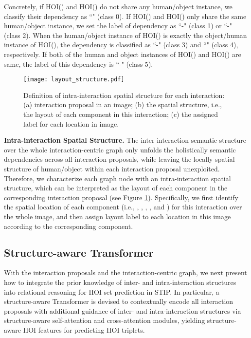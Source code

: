 \documentclass[10pt,twocolumn,letterpaper]{article}
\begin{document}
Concretely, if HOI() and HOI() do not share any human/object instance, we classify their dependency as ``" ({class 0}). If HOI() and HOI() only share the same human/object instance, we set the label of dependency as ``-" ({class 1}) or ``-" ({class 2}). When the human/object instance of HOI() is exactly the object/human instance of HOI(), the dependency is classified as ``-" ({class 3}) and ``" ({class 4}), respectively. If both of the human and object instances of HOI() and HOI() are same, the label of this dependency is ``-" ({class 5}).


\begin{figure}[t]
\vspace{-0.35in}
\begin{center}
   \texttt{[image: layout\_structure.pdf]}
\end{center}
\vspace{-0.26in}
   \caption{Definition of intra-interaction spatial structure for each interaction: (a) interaction proposal in an image; (b) the spatial structure, i.e., the layout of each component in this interaction; (c) the assigned label for each location in image.}
\label{fig:layout_structure}
\vspace{-0.2in}
\end{figure}

\textbf{Intra-interaction Spatial Structure.}
The inter-interaction semantic structure over the whole interaction-centric graph only unfolds the holistically semantic dependencies across all interaction proposals, while leaving the locally spatial structure of human/object within each interaction proposal unexploited. Therefore, we characterize each graph node with an intra-interaction spatial structure, which can be interpreted as the layout of each component in the corresponding interaction proposal (see Figure \ref{fig:layout_structure}). Specifically, we first identify the spatial location of each component (i.e., , , , , and ) for this interaction over the whole image, and then assign layout label  to each location in this image according to the corresponding component.


\subsection{Structure-aware Transformer}
With the  interaction proposals and the interaction-centric graph, we next present how to integrate the prior knowledge of inter- and intra-interaction structures into relational reasoning for HOI set prediction in STIP. In particular, a structure-aware Transformer is devised to contextually encode all interaction proposals with additional guidance of inter- and intra-interaction structures via structure-aware self-attention and cross-attention modules, yielding structure-aware HOI features for predicting HOI triplets.
\end{document}
